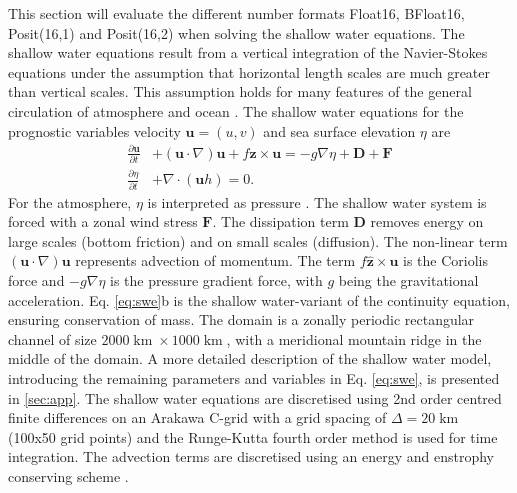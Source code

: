 \documentclass[draft]{agujournal2019}
\newcommand{\op}{\operatorname}
\begin{document}
This section will evaluate the different number formats Float16, BFloat16, Posit(16,1) and Posit(16,2) when solving the shallow water equations. The shallow water equations result from a vertical integration of the Navier-Stokes equations under the assumption that horizontal length scales are much greater than vertical scales. This assumption holds for many features of the general circulation of atmosphere and ocean \cite{Gill1982,Vallis2006}. The shallow water equations for the prognostic variables velocity $\mathbf{u} = (u,v)$ and sea surface elevation $\eta$ are
\begin{subequations}
\begin{align}
\frac{\partial \mathbf{u}}{\partial t} &+ (\mathbf{u} \cdot \nabla) \mathbf{u} + f\hat{\mathbf{z}} \times \mathbf{u} = -g\nabla \eta + \mathbf{D} + \mathbf{F} \\
\frac{\partial \eta}{\partial t} &+ \nabla \cdot (\mathbf{u}h) = 0.
\end{align}
\label{eq:swe}%
\end{subequations}
For the atmosphere, $\eta$ is interpreted as pressure \cite{Gill1982}. The shallow water system is forced with a zonal wind stress $\mathbf{F}$. The dissipation term $\mathbf{D}$ removes energy on large scales (bottom friction) and on small scales (diffusion). The non-linear term $(\mathbf{u} \cdot \nabla) \mathbf{u}$ represents advection of momentum. The term $f\hat{\mathbf{z}} \times \mathbf{u}$ is the Coriolis force and $-g\nabla \eta$ is the pressure gradient force, with $g$ being the gravitational acceleration. Eq. \ref{eq:swe}b is the shallow water-variant of the continuity equation, ensuring conservation of mass. The domain is a zonally periodic rectangular channel of size $2000\op{km} \times 1000\op{km}$, with a meridional mountain ridge in the middle of the domain. A more detailed description of the shallow water model, introducing the remaining parameters and variables in Eq. \ref{eq:swe}, is presented in \ref{sec:app}. The shallow water equations are discretised using 2nd order centred finite differences on an Arakawa C-grid \cite{Arakawa1977} with a grid spacing of $\Delta = 20\operatorname{km}$ (100x50 grid points) and the Runge-Kutta fourth order method \cite{Butcher2008} is used for time integration. The advection terms are discretised using an energy and enstrophy conserving scheme \cite{Arakawa1990}. 
\end{document}
